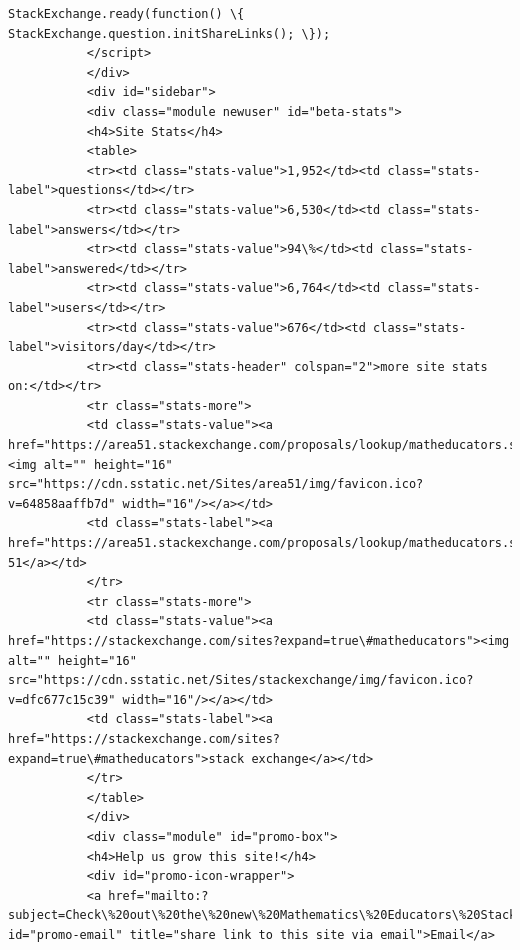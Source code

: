 \documentclass[11pt]{article}
\begin{document}
\begin{Verbatim}[commandchars=\\\{\}]
               StackExchange.ready(function() \{ StackExchange.question.initShareLinks(); \});
           </script>
           </div>
           <div id="sidebar">
           <div class="module newuser" id="beta-stats">
           <h4>Site Stats</h4>
           <table>
           <tr><td class="stats-value">1,952</td><td class="stats-label">questions</td></tr>
           <tr><td class="stats-value">6,530</td><td class="stats-label">answers</td></tr>
           <tr><td class="stats-value">94\%</td><td class="stats-label">answered</td></tr>
           <tr><td class="stats-value">6,764</td><td class="stats-label">users</td></tr>
           <tr><td class="stats-value">676</td><td class="stats-label">visitors/day</td></tr>
           <tr><td class="stats-header" colspan="2">more site stats on:</td></tr>
           <tr class="stats-more">
           <td class="stats-value"><a href="https://area51.stackexchange.com/proposals/lookup/matheducators.stackexchange.com"><img alt="" height="16" src="https://cdn.sstatic.net/Sites/area51/img/favicon.ico?v=64858aaffb7d" width="16"/></a></td>
           <td class="stats-label"><a href="https://area51.stackexchange.com/proposals/lookup/matheducators.stackexchange.com">area 51</a></td>
           </tr>
           <tr class="stats-more">
           <td class="stats-value"><a href="https://stackexchange.com/sites?expand=true\#matheducators"><img alt="" height="16" src="https://cdn.sstatic.net/Sites/stackexchange/img/favicon.ico?v=dfc677c15c39" width="16"/></a></td>
           <td class="stats-label"><a href="https://stackexchange.com/sites?expand=true\#matheducators">stack exchange</a></td>
           </tr>
           </table>
           </div>
           <div class="module" id="promo-box">
           <h4>Help us grow this site!</h4>
           <div id="promo-icon-wrapper">
           <a href="mailto:?subject=Check\%20out\%20the\%20new\%20Mathematics\%20Educators\%20Stack\%20Exchange\%20Q\%26A\%20site\%20from\%20Stack\%20Exchange\&amp;body=Hi!\%0d\%0a\%0d\%0aI\%27m\%20supporting\%20a\%20new\%20Q\%26A\%20website\%20for\%20those\%20involved\%20in\%20the\%20field\%20of\%20teaching\%20mathematics.\%0d\%0a\%0d\%0aIt\%27s\%20built\%20on\%20the\%20same\%20software\%20as\%20stackoverflow.com\%2c\%20a\%20hugely\%20popular\%20site\%20where\%20over\%20seven\%20million\%20programmers\%20help\%20each\%20other\%20with\%20difficult\%20programming\%20problems.\%20On\%20Stack\%20Overflow\%20the\%20audience\%20votes\%20for\%20the\%20best\%20answer\%2c\%20so\%20the\%20answer\%20you\%20want\%20is\%20usually\%20right\%20at\%20the\%20top\%2c\%20not\%20on\%20page\%20five.\%0d\%0a\%0d\%0aI\%27m\%20hoping\%20that\%20a\%20site\%20for\%20those\%20involved\%20in\%20the\%20field\%20of\%20teaching\%20mathematics\%20would\%20have\%20the\%20same\%20kind\%20of\%20network\%20effect\%20and\%20turn\%20into\%20an\%20amazing\%20resource.\%0d\%0a\%0d\%0aThe\%20public\%20beta\%20is\%20going\%20on\%20here\%2c\%20if\%20you\%27re\%20interested\%20in\%20participating\%3a\%0d\%0a\%0d\%0ahttps\%3a\%2f\%2fmatheducators.stackexchange.com\%0d\%0a\%0d\%0aThanks!" id="promo-email" title="share link to this site via email">Email</a>

\end{Verbatim}
\end{document}
